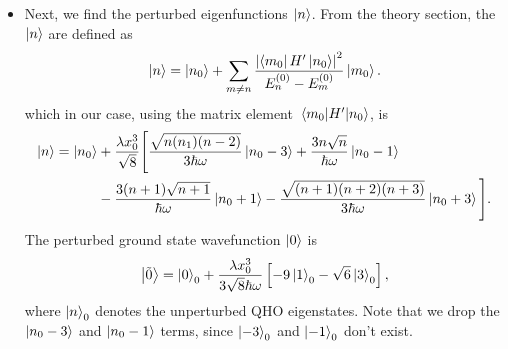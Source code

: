 \documentclass[11pt, a4paper]{article}
\newcommand{\Ham}{Hamiltonian\xspace}
\renewcommand{\t}[1]{\tilde{#1}}
\begin{document}
\begin{itemize}
	Next, we substitute in the energy differences (e.g. $ E^{(0)}_{n} - E^{(0)}_{n-3} = 3\hbar \omega$) in the denominators, which are known from the unperturbed \Ham $ H_{0} $, where the energies are equally spaced by $ \hbar \omega $. Substituting in energies and factoring out $ \hbar \omega $ gives
	\begin{align*}
		E_{n} &= E^{(0)}_{n} + \frac{\lambda^{2} x_{0}^{6}}{24 \hbar \omega}\left[n(n-1)(n-2) + 27n^{3} - 27(n+1)^{3} - (n+1)(n+2)(n+3) \right]\\
		& = E^{(0)}_{n} + \frac{\lambda^{2} x_{0}^{6}}{24 \hbar \omega} \left(n^{3}-3n^{2} + 2n + 27n^{3} - 27n^{3} - 81n^{2} - 81n - 27 - n^{3} - 6n^{2} - 11n - 6\right)\\
		&=E^{(0)}_{n} - \frac{\lambda^{2} x_{0}^{6}}{24 \hbar \omega} \left(90n^{2} + 90n + 33\right)\\
		&=E^{(0)}_{n} - \frac{\lambda^{2} x_{0}^{6}}{8 \hbar \omega} \left(30n^{2} + 30n + 11\right).
	\end{align*}
	Note that the energy correction is negative---the perturbed energies $ E_{n} $ are lower than the standard QHO energies $ E^{(0)}_{n} $.
	
	\item Next, we find the perturbed eigenfunctions $ \ket{n} $. From the theory section, the $ \ket{n} $ are defined as
	\begin{equation*}
		\ket{n} = \ket{n_{0}} + \sum_{m\neq n}\frac{\abs{\bra{m_{0}}H'\ket{n_{0}}}^{2}}{E^{(0)}_{n}-E^{(0)}_{m}} \ket{m_{0}}.
	\end{equation*}
	which in our case, using the matrix element $ \mel{m_{0}}{H'}{n_{0}}  $, is
	\begin{align*}
		\ket{n} =
		\ket{n_{0}} &+ \frac{\lambda x_{0}^{3}}{\sqrt{8}}\Bigg[\frac{\sqrt{n(n_1)(n-2)}}{3\hbar \omega}\ket{n_{0}-3} + \frac{3n\sqrt{n}}{\hbar \omega}\ket{n_{0}-1} \\
		&- \frac{3(n+1)\sqrt{n+1}}{\hbar \omega}\ket{n_{0}+1} - \frac{\sqrt{(n+1)(n+2)(n+3)}}{3\hbar \omega}\ket{n_{0}+3}\Bigg].
	\end{align*}
	The perturbed ground state wavefunction $ \ket{0} $ is
	\begin{equation*}
		\ket{\t{0}} = \ket{0}_{0} + \frac{\lambda x_{0}^{3}}{3\sqrt{8}\hbar\omega}\left[-9\ket{1}_{0} - \sqrt{6}\ket{3}_{0}\right],
	\end{equation*}
	where $ \ket{n}_{0} $ denotes the unperturbed QHO eigenstates. Note that we drop the $ \ket{n_{0}-3} $ and $ \ket{n_{0}-1} $ terms, since $ \ket{-3}_{0} $ and $ \ket{-1}_{0} $ don't exist.
	

\end{itemize}
\end{document}
